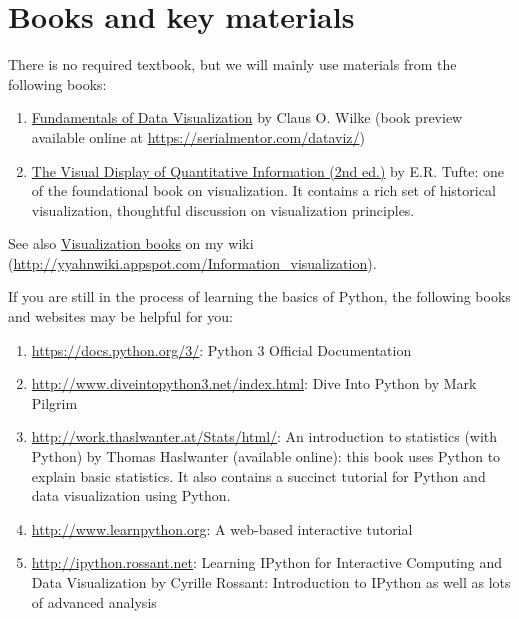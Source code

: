 \documentclass[11pt,article,oneside]{memoir} %
\begin{document}
\section{Books and key materials}%

There is no required textbook, but we will mainly use materials from the following books:

\begin{enumerate}
    
\item \href{https://serialmentor.com/dataviz/}{Fundamentals of Data Visualization} by Claus O. Wilke (book preview available online at \url{https://serialmentor.com/dataviz/})

\item \href{http://www.amazon.com/gp/product/0961392142}{The Visual Display of Quantitative Information (2nd ed.)} by E.R. Tufte: one of the foundational book on visualization. It contains a rich set of historical visualization, thoughtful discussion on visualization principles. 

\end{enumerate}

See also \href{http://yyahnwiki.appspot.com/Information_visualization#h_6225eb5bf8a031f750a1b03f810ccc6a}{Visualization books} on my wiki (\url{http://yyahnwiki.appspot.com/Information_visualization}). 


If you are still in the process of learning the basics of Python, the following books and websites may be helpful for you:


\begin{enumerate}%

\item \url{https://docs.python.org/3/}: Python 3 Official Documentation

\item \url{http://www.diveintopython3.net/index.html}: Dive Into Python by Mark Pilgrim 

\item \url{http://work.thaslwanter.at/Stats/html/}: An introduction to statistics (with Python) by Thomas Haslwanter (available online): this book uses Python to explain basic statistics. It also contains a succinct tutorial for Python and data visualization using Python. 

\item \url{http://www.learnpython.org}: A web-based interactive tutorial 

\item \url{http://ipython.rossant.net}: Learning IPython for Interactive Computing and Data Visualization by Cyrille Rossant: Introduction to IPython as well as lots of advanced analysis 

\end{enumerate}%
\end{document}
